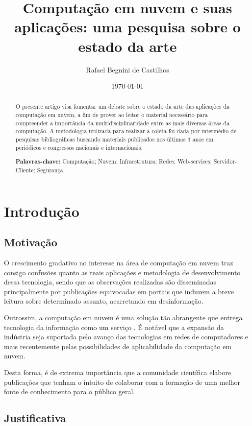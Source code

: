 \documentclass[12pt]{article}
\author{Rafael Begnini de Castilhos}
\title{Computação em nuvem e suas aplicações: uma pesquisa sobre o estado da arte}
\date{\today}
\begin{document}
\maketitle

\begin{abstract}
O presente artigo visa fomentar um debate sobre o estado da arte das aplicações da computação em nuvem, a fim de prover ao leitor o material necessário para compreender a importância da multidisciplinaridade entre as mais diversas áreas da computação. A metodologia utilizada para realizar a coleta foi dada por intermédio de pesquisas bibliográficas buscando materiais publicados nos últimos 3 anos em periódicos e congressos nacionais e internacionais.

\textbf{Palavras-chave:} Computação; Nuvem; Infraestrutura; Redes; Web-services; Servidor-Cliente; Segurança.

\end{abstract}

\section{Introdução}

\subsection{Motivação}

O crescimento gradativo no interesse na área de computação em nuvem traz consigo confusões quanto as reais aplicações e metodologia de desenvolvimento dessa tecnologia, sendo que as observações realizadas são disseminadas principalmente por publicações equivocadas em portais que induzem a breve leitura sobre determinado assunto, acarretando em desinformação. 

Outrossim, a computação em nuvem é uma solução tão abrangente que entrega tecnologia da informação como um serviço \cite{oliveira}. É notável que a expansão da indústria seja suportada pelo avanço das tecnologias em redes de computadores e mais recentemente pelas possibilidades de aplicabilidade da computação em nuvem.

Desta forma, é de extrema importância que a comunidade científica elabore publicações que tenham o intuito de colaborar com a formação de uma melhor fonte de conhecimento para o público geral.

\subsection{Justificativa}
\end{document}
